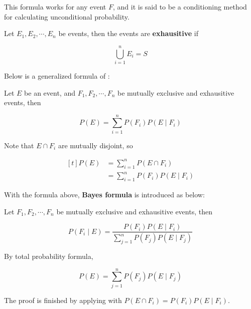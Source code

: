 \documentclass[a4paper,12pt]{article}
\begin{document}
This formula works for any event $F$, and it is said to be a conditioning method for calculating unconditional probability.\n

\begin{dft}
  Let $E_{1},E_{2},\cdots,E_{n}$ be events, then the events are \textbf{exhausitive} if

  $$\bigcup_{i=1}^{n}E_{i}=S$$
\end{dft}\n

Below is a generalized formula of \rpst[\sctd{1}]:\n

\begin{crl}
  Let $E$ be an event, and $F_{1},F_{2},\cdots,F_{n}$ be mutually exclusive and exhausitive events, then

  $$P(E)=\sum_{i=1}^{n}P(F_{i})P(E\mid F_{i})$$\s

  \prf Note that $E\cap F_{i}$ are mutually disjoint, so

  $$\begin{aligned}[t]
    P(E)&=\sum_{i=1}^{n}P(E\cap F_{i})\\
    &=\sum_{i=1}^{n}P(F_{i})P(E\mid F_{i})
  \end{aligned}$$
\end{crl}\n

With the formula above, \textbf{Bayes formula} is introduced as below:\n

\begin{thm}
  Let $F_{1},F_{2},\cdots,F_{n}$ be mutually exclusive and exhausitive events, then

  $$P(F_{i}\mid E)=\frac{P(F_{i})P(E\mid F_{i})}{\sum_{j=1}^{n}P(F_{j})P(E\mid F_{j})}$$\s

  \prf By total probability formula,

  $$P(E)=\sum_{j=1}^{n}P(F_{j})P(E\mid F_{j})$$\s

  The proof is finished by applying \rdft[\sctd{5}] with $P(E\cap F_{i})=P(F_{i})P(E\mid F_{i})$.
\end{thm}\n
\end{document}
